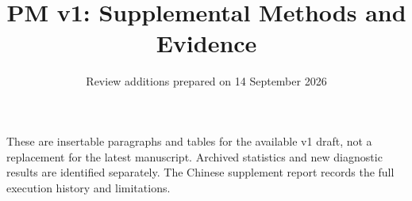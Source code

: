 \documentclass[10pt]{article}
\title{PM v1: Supplemental Methods and Evidence}
\author{Review additions prepared on 14 September 2026}
\date{}
\begin{document}
\maketitle
\noindent These are insertable paragraphs and tables for the available v1
draft, not a replacement for the latest manuscript. Archived statistics and
new diagnostic results are identified separately. The Chinese supplement
report records the full execution history and limitations.

\end{document}
